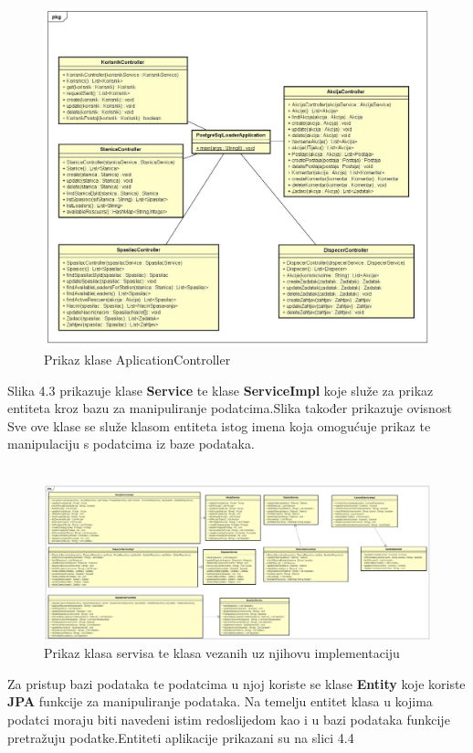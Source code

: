 	\begin{figure}[h!]
		\centering
		\includegraphics[width = \linewidth]{./slike/Controllers.jpg}
		\caption{Prikaz klase AplicationController}
		
	\end{figure}
	\newpage
	
	{Slika 4.3 prikazuje klase \textbf{Service} te klase \textbf{ServiceImpl} }
	{koje služe za prikaz entiteta kroz bazu za manipuliranje podatcima.\newline Slika također prikazuje ovisnost Sve ove klase se služe klasom entiteta istog imena koja omogućuje prikaz te manipulaciju s podatcima iz baze podataka.\\}\\
	
	\begin{figure}[h!]
		\centering
		\includegraphics[width=\linewidth]{./slike/ServisImpl.jpg}
		\caption{Prikaz klasa servisa te klasa vezanih uz njihovu implementaciju}
		
	\end{figure}	
	\newpage
	{Za pristup bazi podataka te podatcima u njoj koriste se klase \textbf{Entity} koje koriste \textbf{JPA} funkcije za manipuliranje podataka. Na temelju entitet klasa u kojima podatci moraju biti navedeni istim redoslijedom kao i u bazi podataka funkcije pretražuju podatke.Entiteti aplikacije prikazani su na slici 4.4\\}
	
